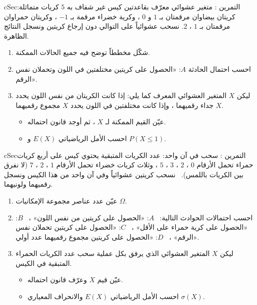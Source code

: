 \documentclass[12pt,a4paper]{article}
\newenvironment{BOX}[2]{\begin{otherlanguage}{english}\begin{arbox}{#1}{#2}}{\end{arbox}\end{otherlanguage}}
\newcounter{exo}
\newenvironment{tamrin}[1]{\stepcounter{exo}\begin{BOX}{cSec}{التمرين \theexo: #1}}{\end{BOX}}
\newenvironment{sq}{\begin{itemize}[leftmargin=2.4em,itemsep=3pt]}{\end{itemize}}
\newcommand{\qa}{\item[(أ)]}\newcommand{\qb}{\item[(ب)]}\newcommand{\qc}{\item[(جـ)]}\newcommand{\qd}{\item[(د)]}\newcommand{\qe}{\item[(هـ)]}
\begin{document}
\begin{tamrin}{متغير عشوائي معرّف بقاعدتين}
كيس غير شفاف به $5$ كريات متماثلة: كريتان بيضاوان مرقمتان بـ $1$ و $0$ ، وكرية خضراء مرقمة بـ $-1$ ، وكريتان حمراوان مرقمتان بـ $1$ ، $2$. نسحب عشوائياً على التوالي دون إرجاع كريتين ونسجل النتائج الظاهرة.
\begin{enumerate}
\item شكّل مخططاً توضح فيه جميع الحالات الممكنة.
\item احسب احتمال الحادثة $A$: «الحصول على كريتين مختلفتين في اللون وتحملان نفس الرقم».
\item ليكن $X$ المتغير العشوائي المعرف كما يلي: إذا كانت الكريتان من نفس اللون يحدد $X$ جداء رقميهما ، وإذا كانت مختلفتين في اللون يحدد $X$ مجموع رقميهما.
\begin{sq}
\qa عيّن القيم الممكنة لـ $X$ ، ثم أوجد قانون احتماله.
\qb احسب الأمل الرياضياتي $E(X)$ و $P(X\le1)$.
\end{sq}
\end{enumerate}
\end{tamrin}

\begin{tamrin}{سحب في آن واحد: عدد الكريات المتبقية}
يحتوي كيس على أربع كريات حمراء تحمل الأرقام $0$ ، $2$ ، $3$ ، $5$ ، وثلاث كريات خضراء تحمل الأرقام $1$ ، $2$ ، $7$ (لا نفرق بين الكريات باللمس). \ نسحب كريتين عشوائياً وفي آن واحد من هذا الكيس ونسجل رقميهما ولونيهما.
\begin{enumerate}
\item عيّن عدد عناصر مجموعة الإمكانيات $\Omega$.
\item احسب احتمالات الحوادث التالية: \ $A$: «الحصول على كريتين من نفس اللون» ، \ $B$: «الحصول على كرية حمراء على الأقل» ، \ $C$: «الحصول على كريتين تحملان نفس الرقم» ، \ $D$: «الحصول على كريتين مجموع رقميهما عدد أولي».
\item ليكن $X$ المتغير العشوائي الذي يرفق بكل عملية سحب عدد الكريات الحمراء المتبقية في الكيس.
\begin{sq}
\qa عيّن قيم $X$ وعرّف قانون احتماله.
\qb احسب الأمل الرياضياتي $E(X)$ والانحراف المعياري $\sigma(X)$.
\end{sq}
\end{enumerate}
\end{tamrin}
\end{document}
